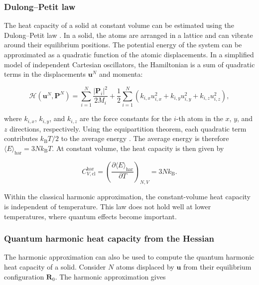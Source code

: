 \documentclass[12pt,a4paper]{article}
\numberwithin{equation}{section}
\begin{document}
\subsubsection{Dulong--Petit law}
\label{sec:dulong-petit}

The heat capacity of a solid at constant volume can be estimated using the Dulong--Petit law \cite{ashcroft1976}.
In a solid, the atoms are arranged in a lattice and can vibrate around their equilibrium positions.
The potential energy of the system can be approximated as a quadratic function of the atomic displacements.
In a simplified model of independent Cartesian oscillators, the Hamiltonian is a sum of quadratic terms in the displacements $\bm u^N$ and momenta:

\begin{equation}
  \mathcal H(\bm u^N,\bm P^N)=\sum_{i=1}^{N}\frac{|\bm P_i|^2}{2M_i}
      +\frac12\sum_{i=1}^{N}(k_{i,x}u_{i,x}^2+k_{i,y}u_{i,y}^2+k_{i,z}u_{i,z}^2),
  \label{eq:harmonic-hamiltonian}
\end{equation}

where $k_{i,x}$, $k_{i,y}$, and $k_{i,z}$ are the force constants for the $i$-th atom in the $x$, $y$, and $z$ directions, respectively.
Using the equipartition theorem, each quadratic term contributes $k_{\mathrm B}T/2$ to the average energy \cite{tuckerman2023}.
The average energy is therefore $\langle E\rangle_{\mathrm{har}}=3Nk_{\mathrm B}T$.
At constant volume, the heat capacity is then given by

\begin{equation}
  C_{V,\mathrm{cl}}^{\mathrm{har}}=\left(\frac{\partial\langle E\rangle_{\mathrm{har}}}{\partial T}\right)_{N,V}=3Nk_{\mathrm B}.
  \label{eq:dulong-petit}
\end{equation}

Within the classical harmonic approximation, the constant-volume heat capacity is independent of temperature.
This law does not hold well at lower temperatures, where quantum effects become important.

\subsubsection{Quantum harmonic heat capacity from the Hessian}
\label{sec:quantum-harmonic-model}

The harmonic approximation can also be used to compute the quantum harmonic heat capacity of a solid.
Consider $N$ atoms displaced by $\bm u$ from their equilibrium configuration $\bm R_0$. The harmonic approximation gives
\end{document}
